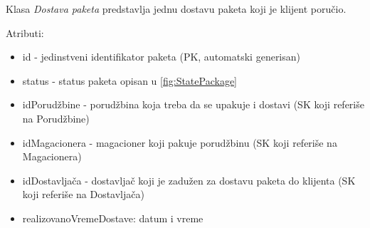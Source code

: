 Klasa \textit{Dostava paketa} predstavlja jednu dostavu paketa koji je klijent poručio.

Atributi:
\begin{itemize}
    \item id - jedinstveni identifikator paketa (PK, automatski generisan)
    \item status - status paketa opisan u \ref{fig:StatePackage}
    \item idPorudžbine - porudžbina koja treba da se upakuje i dostavi (SK koji referiše na Porudžbine)
    \item idMagacionera - magacioner koji pakuje porudžbinu (SK koji referiše na Magacionera)
    \item idDostavljača - dostavljač koji je zadužen za dostavu paketa do klijenta (SK koji referiše na Dostavljača)
    \item realizovanoVremeDostave: datum i vreme
\end{itemize}
